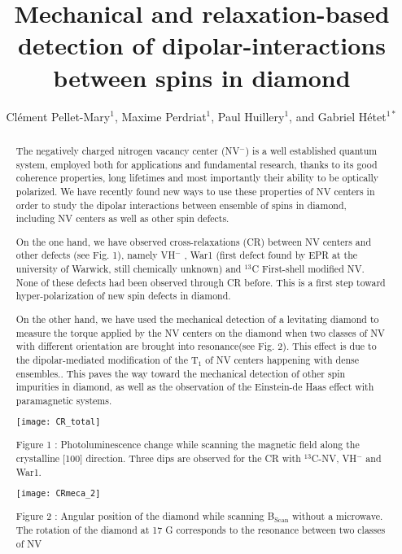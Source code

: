 \documentclass[aps,twocolumn,showpacs]{revtex4-1}
\begin{document}
\title{Mechanical and relaxation-based detection of dipolar-interactions between spins in diamond}

\author{Clément Pellet-Mary$^1$, Maxime Perdriat$^1$, Paul Huillery$^1$, and Gabriel Hétet$^{1*}$}


\begin{abstract}
\normalsize
The negatively charged nitrogen vacancy center (NV$^-$) is a well established quantum system, employed both for applications and fundamental research, thanks to its good coherence properties, long lifetimes and most importantly their ability to be optically polarized.
We have recently found new ways to use these properties of NV centers in order to study the dipolar interactions between ensemble of spins in diamond, including NV centers as well as other spin defects. 

On the one hand, we have observed cross-relaxations (CR) between NV centers and other defects (see Fig. 1), namely VH$^-$ \cite{VH}, War1 (first defect found by EPR at the university of Warwick, still chemically unknown) and $^{13}$C First-shell modified NV. None of these defects had been observed through CR before. This is a first step toward hyper-polarization of new spin defects in diamond.

On the other hand, we have used the mechanical detection of a levitating diamond \cite{nature} to measure the torque applied by the NV centers on the diamond when two classes of NV with different orientation are brought into resonance(see Fig. 2). This effect is due to the dipolar-mediated modification of the T$_1$ of NV centers happening with dense ensembles.\cite{Lukin}. This paves the way toward the mechanical detection of other spin impurities in diamond, as well as the observation of the Einstein-de Haas effect with paramagnetic systems. \cite{Meriles}

\begin{center}
\texttt{[image: CR\_total]}
\end{center}

Figure 1 : Photoluminescence change while scanning the magnetic field along the crystalline [100] direction. Three dips are observed for the CR with $^{13}$C-NV, VH$^-$ and War1.

\begin{center}
\texttt{[image: CRmeca\_2]}
\end{center}

Figure 2 : Angular position of the diamond while scanning B$_{\mathrm{Scan}}$ without a microwave. The rotation of the diamond at 17 G corresponds to the resonance between two classes of NV
\end{abstract}
\end{document}
